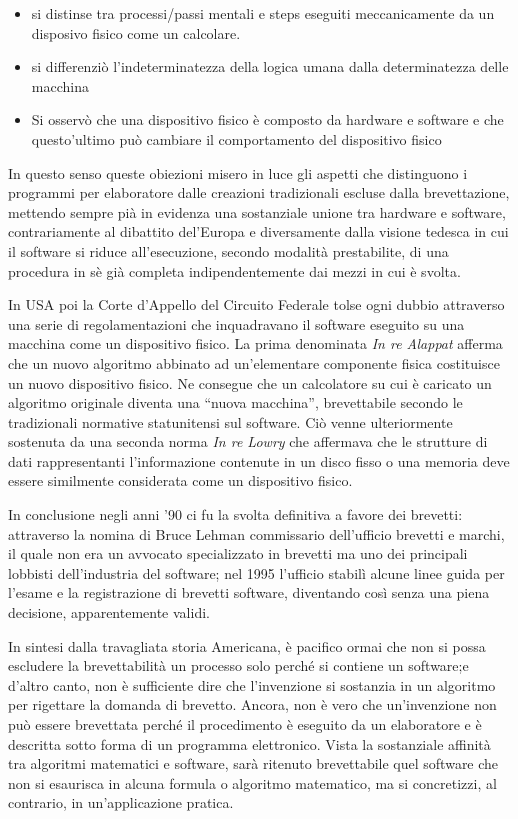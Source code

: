 \begin{itemize}
	\item si distinse tra processi/passi mentali e steps eseguiti meccanicamente da un disposivo fisico come un calcolare.
	\item si differenziò l'indeterminatezza della logica umana dalla determinatezza delle macchina
	\item Si osservò che una dispositivo fisico è composto da hardware e software e che questo'ultimo può cambiare il comportamento del dispositivo fisico
\end{itemize}
In questo senso queste obiezioni misero in luce gli aspetti che distinguono i programmi per elaboratore dalle creazioni tradizionali escluse dalla brevettazione, mettendo sempre pià in evidenza una sostanziale unione tra hardware e software, contrariamente al dibattito del'Europa e  diversamente dalla visione tedesca in cui il software si riduce all'esecuzione, secondo modalità prestabilite, di una procedura in sè già completa indipendentemente dai mezzi in cui è svolta.

In USA poi la Corte d'Appello del Circuito Federale tolse ogni dubbio attraverso una serie di regolamentazioni che inquadravano il software eseguito su una macchina come un dispositivo fisico. La prima denominata \textit{In re Alappat} afferma che un nuovo algoritmo abbinato ad un'elementare componente fisica costituisce un nuovo dispositivo fisico. Ne consegue che un calcolatore su cui è caricato un algoritmo originale diventa una ``nuova macchina'', brevettabile secondo le tradizionali normative statunitensi sul software. Ciò venne ulteriormente sostenuta da una seconda norma \textit{In re Lowry} che affermava che le strutture di dati rappresentanti l'informazione contenute in un disco fisso o una memoria deve essere similmente considerata come un dispositivo fisico.

In conclusione negli anni '90 ci fu la svolta definitiva a favore dei brevetti: attraverso la nomina di Bruce Lehman commissario dell'ufficio brevetti e marchi, il quale non era un avvocato specializzato in brevetti ma uno dei principali lobbisti dell'industria del software; nel 1995 l'ufficio stabilì alcune linee guida per l'esame e la registrazione di brevetti software, diventando così senza una piena decisione, apparentemente validi.

In sintesi dalla travagliata storia Americana, è pacifico ormai che non si possa escludere la brevettabilità un processo solo perché si contiene un software;e d'altro canto, non è sufficiente dire che l'invenzione si sostanzia in un algoritmo per rigettare la domanda di brevetto. Ancora, non è vero che un'invenzione non può essere brevettata perché il procedimento è eseguito da un elaboratore e è descritta sotto forma di un programma elettronico. Vista la sostanziale affinità tra algoritmi matematici e software, sarà ritenuto brevettabile quel software che non si esaurisca in alcuna formula o algoritmo matematico, ma si concretizzi, al contrario, in un'applicazione pratica.

